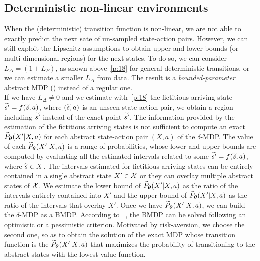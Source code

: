 \subsection{Deterministic non-linear environments}
When the (deterministic) transition function is non-linear, we are not able to exactly predict the next sate of un-sampled state-action pairs. However, we can still exploit the Lipschitz assumptions to obtain upper and lower bounds (or multi-dimensional regions) for the next-states. To do so, we can consider $L_{\Delta} = \left(1 + L_{P} \right)$, as shown above~\eqref{p:18} for general deterministic transitions, or we can estimate a smaller $L_{\Delta}$ from data.
The result is a \emph{bounded-parameter} abstract \ac{MDP} () instead of a regular one.\\
\newline
If we have $L_{\Delta} \neq 0$ and we estimate with~\eqref{p:18} the fictitious arriving state $\widetilde{s'} = f(\widetilde{s}, a)$, where $(\widetilde{s},a)$ is an unseen state-action pair, we obtain a region including $\widetilde{s'}$ instead of the exact point $\widetilde{s'}$. The information provided by the estimation of the fictitious arriving states is not sufficient to compute an exact $\widetilde{P}_{\boldsymbol{\theta}}(X'|X,a)$ for each abstract state-action pair $(X,a)$ of the $\delta$-\ac{MDP}. The value of each $\widetilde{P}_{\boldsymbol{\theta}}(X'|X,a)$ is a range of probabilities, whose lower and upper bounds are computed by evaluating all the estimated intervals related to some $\widetilde{s'}=f(\widetilde{s}, a)$, where $\widetilde{s} \in X$. The intervals estimated for fictitious arriving states can be entirely contained in a single abstract state $X' \in \mathcal{X}$ or they can overlay multiple abstract states of $\mathcal{X}$. We estimate the lower bound of $\widetilde{P}_{\boldsymbol{\theta}}(X'|X,a)$ as the ratio of the intervals entirely contained into $X'$ and the upper bound of $\widetilde{P}_{\boldsymbol{\theta}}(X'|X,a)$ as the ratio of the intervals that overlay $X'$. Once we have $\widetilde{P}_{\boldsymbol{\theta}}(X'|X,a)$, we can build the $\delta$-\ac{MDP} as a \ac{BMDP}. According to ~\citep{givan2000bounded}, the \ac{BMDP} can be solved following an optimistic or a pessimistic criterion. Motivated by risk-aversion, we choose the second one, so as to obtain the solution of the exact \ac{MDP} whose transition function is the $\widetilde{P}_{\boldsymbol{\theta}}(X'|X,a)$ that maximizes the probability of transitioning to the abstract states with the lowest value function.

